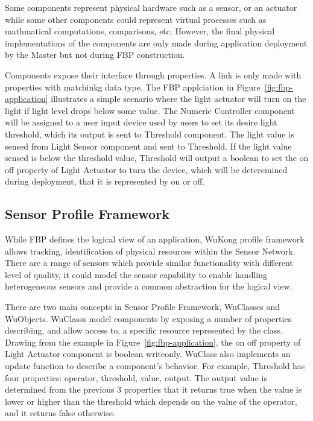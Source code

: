 Some components represent physical hardware such as a sensor, or an actuator
while some other components could represent virtual processes such as
mathmatical computations, comparisons, etc. However, the final physical implementations
of the components are only made during application deployment by the Master but
not during FBP construction.

Components expose their interface through properties. A link is only made with
properties with matchinkg data type. The FBP applciation in
Figure~\ref{fig:fbp-application} illustrates a simple scenario where the light actuator
will turn on the light if light level drops below some value. The Numeric
Controller component will be assigned to a user input device used by users to
set its desire light threshold, which its output is sent to Threshold
component. The light value is sensed from Light Sensor component and sent to
Threshold. If the light value sensed is below the threshold value, Threshold
will output a boolean to set the on off property of Light Actuator to turn the
device, which will be deteremined during deployment, that it is represented by
on or off.

\subsection{Sensor Profile Framework}

While FBP defines the logical view of an application, WuKong profile framework allows
tracking, identification of physical resources within the Sensor Network.
There are a range of sensors which provide similar functionality with different
level of quality, it could model the sensor capability to enable handling
heterogeneous sensors and provide a common abstraction for the logical view.

There are two main concepts in Sensor Profile Framework, WuClasses and
WuObjects. WuClasss model components by exposing a number of properties
describing, and allow access to, a specific resource represented by the class.
Drawing from the example in Figure~\ref{fig:fbp-application}, the on off property of Light
Actuator component is boolean writeonly. WuClass also implements an update
function to describe a component's behavior. For
example, Threshold has four properties: operator, threshold, value, output. The
output value is determined from the previous 3 properties that it returns true
when the value is lower or higher than the threshold which depends on the value
of the operator, and it returns false otherwise.


